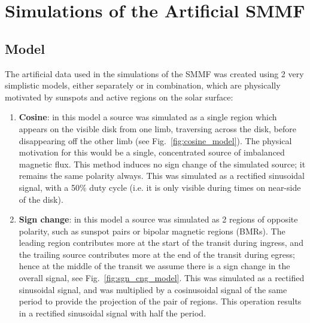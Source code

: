 \chapter{Simulations of the Artificial SMMF}\label{app:SMMF_sims}


\section{Model}

The artificial data used in the simulations of the SMMF was created using 2 very simplistic models, either separately or in combination, which are physically motivated by sunspots and active regions on the solar surface:

\begin{enumerate}
	
	\item{{\bf Cosine}: in this model a source was simulated as a single region which appears on the visible disk from one limb, traversing across the disk, before disappearing off the other limb (see Fig.~\ref{fig:cosine_model}). The physical motivation for this would be a single, concentrated source of imbalanced magnetic flux. This method induces no sign change of the simulated source; it remains the same polarity always. This was simulated as a rectified sinusoidal signal, with a 50$\%$ duty cycle (i.e. it is only visible during times on near-side of the disk).}
	
	\item{{\bf Sign change}: in this model a source was simulated as 2 regions of opposite polarity, such as sunspot pairs or bipolar magnetic regions (BMRs). The leading region contributes more at the start of the transit during ingress, and the trailing source contributes more at the end of the transit during egress; hence at the middle of the transit we assume there is a sign change in the overall signal, see Fig.~\ref{fig:sgn_cng_model}. This was simulated as a rectified sinusoidal signal, and was multiplied by a cosinusoidal signal of the same period to provide the projection of the pair of regions. This operation results in a rectified sinusoidal signal with half the period.}
	
\end{enumerate}

